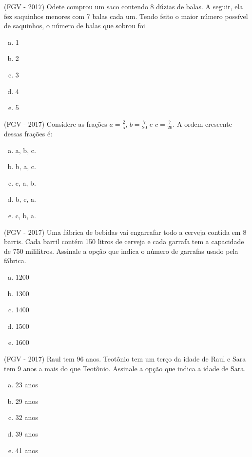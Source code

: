 \begin{exer}
 (FGV - 2017) Odete comprou um saco contendo 8 dúzias de balas. A seguir, ela fez saquinhos menores com 7 balas cada um. Tendo feito o maior número possível de saquinhos, o número de balas que sobrou foi
  \begin{enumerate}[a)]
  \item 1
  \item 2
  \item 3
  \item 4
  \item 5
  \end{enumerate}
 \end{exer}

 \begin{exer}
 (FGV - 2017) Considere as frações $a= \frac{2}{5}$, $b=\frac{7}{20}$ e $c=\frac{7}{20}$. A ordem crescente dessas frações é:
  \begin{enumerate}[a)]
  \item a, b, c.
  \item b, a, c.
  \item c, a, b.
  \item b, c, a.
  \item c, b, a.
  \end{enumerate}
 \end{exer}

 \begin{exer}
 (FGV - 2017) Uma fábrica de bebidas vai engarrafar todo a cerveja contida em 8 barris. Cada barril contém 150 litros de cerveja e cada garrafa tem a capacidade de 750 mililitros. Assinale a opção que indica o número de garrafas usado pela fábrica.
  \begin{enumerate}[a)]
  \item 1200
  \item 1300
  \item 1400
  \item 1500
  \item 1600
  \end{enumerate}
 \end{exer}

 \begin{exer}
 (FGV - 2017) Raul tem 96 anos. Teotônio tem um terço da idade de Raul e Sara tem 9 anos a mais do que Teotônio. Assinale a opção que indica a idade de Sara.
  \begin{enumerate}[a)]
  \item 23 anos
  \item 29 anos
  \item 32 anos
  \item 39 anos
  \item 41 anos
  \end{enumerate}
 \end{exer}


